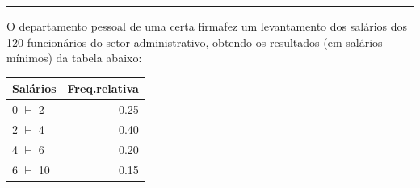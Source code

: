 \documentclass[a4paper,11pt,fleqn]{article}\usepackage[]{graphicx}\usepackage[]{color}
\theoremstyle{definition}
\begin{document}
\vspace{0.3cm}
\hrule
\vspace{0.3cm}

\begin{compactenum}[8.] %
\item O departamento pessoal de uma certa firmafez um levantamento dos
  salários dos 120 funcionários do setor administrativo, obtendo os
  resultados (em salários mínimos) da tabela abaixo:
\begin{table}[ht]
\centering
\begin{tabular}{lr}
  \hline
Salários & Freq.relativa \\ 
  \hline
0 $\vdash$ 2 & 0.25 \\ 
  2 $\vdash$ 4 & 0.40 \\ 
  4 $\vdash$ 6 & 0.20 \\ 
  6 $\vdash$ 10 & 0.15 \\ 
   \hline
\end{tabular}
\end{table}


\end{compactenum}
\end{document}
